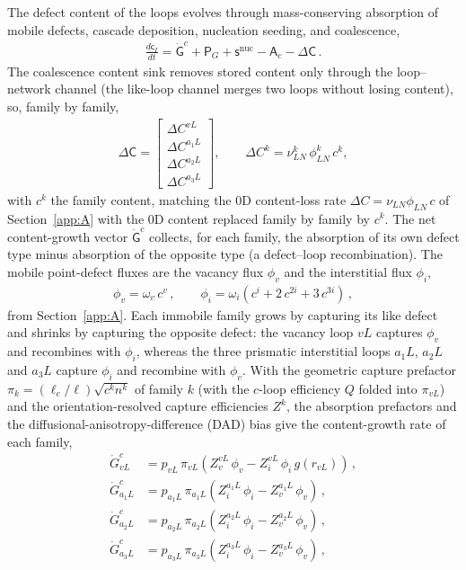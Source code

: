 \documentclass{article}
\newcommand{\spvec}[1]{\bm{\mathsf{#1}}}   %
\begin{document}
The defect content of the loops evolves through mass-conserving absorption of mobile defects, cascade deposition, nucleation seeding, and coalescence,
\begin{align}\label{eq:CIode}
\frac{d\spvec{c}_I}{dt}=
\dot{\spvec{G}}^{c}
+\spvec{P}_G
+\spvec{s}^{\mathrm{nuc}}
-\spvec{A}_c
-\Delta\spvec{C}\, .
\end{align}
The coalescence content sink removes stored content only through the loop--network channel (the like-loop channel merges two loops without losing content), so, family by family,
\begin{align}\label{eq:DeltaC}
\Delta\spvec{C}=\begin{bmatrix}\Delta C^{vL}\\[2pt]\Delta C^{a_1L}\\[2pt]\Delta C^{a_2L}\\[2pt]\Delta C^{a_3L}\end{bmatrix},\qquad
\Delta C^{k}=\nu_{LN}^{k}\,\phi_{LN}^{k}\,c^{k},
\end{align}
with $c^{k}$ the family content, matching the $0$D content-loss rate $\Delta C=\nu_{LN}\phi_{LN}\,c$ of Section~\ref{app:A} with the $0$D content replaced family by family by $c^{k}$.
The net content-growth vector $\dot{\spvec{G}}^{c}$ collects, for each family, the absorption of its own defect type minus absorption of the opposite type (a defect--loop recombination). The mobile point-defect fluxes are the vacancy flux $\phi_v$ and the interstitial flux $\phi_i$,
\begin{align}\label{eq:fluxdef}
\phi_v=\omega_v\,c^v\, ,\qquad
\phi_i=\omega_i\left(c^i+2\,c^{2i}+3\,c^{3i}\right)\, ,
\end{align}
from Section~\ref{app:A}. Each immobile family grows by capturing its like defect and shrinks by capturing the opposite defect: the vacancy loop $vL$ captures $\phi_v$ and recombines with $\phi_i$, whereas the three prismatic interstitial loops $a_1L$, $a_2L$ and $a_3L$ capture $\phi_i$ and recombine with $\phi_v$. With the geometric capture prefactor $\pi_k=(\ell_c/\ell)\sqrt{c^k n^k}$ of family $k$ (with the $c$-loop efficiency $Q$ folded into $\pi_{vL}$) and the orientation-resolved capture efficiencies $Z^k$, the absorption prefactors and the diffusional-anisotropy-difference (DAD) bias give the content-growth rate of each family,
\begin{align}\label{eq:loopcoupling}
\dot G^{c}_{vL}   &=p_{vL}\,\pi_{vL}\left(Z^{vL}_{v}\,\phi_v-Z^{vL}_{i}\,\phi_i\,g(r_{vL})\right)\, ,\\
\dot G^{c}_{a_1L} &=p_{a_1L}\,\pi_{a_1L}\left(Z^{a_1L}_{i}\,\phi_i-Z^{a_1L}_{v}\,\phi_v\right)\, ,\\
\dot G^{c}_{a_2L} &=p_{a_2L}\,\pi_{a_2L}\left(Z^{a_2L}_{i}\,\phi_i-Z^{a_2L}_{v}\,\phi_v\right)\, ,\\
\dot G^{c}_{a_3L} &=p_{a_3L}\,\pi_{a_3L}\left(Z^{a_3L}_{i}\,\phi_i-Z^{a_3L}_{v}\,\phi_v\right)\, ,
\end{align}
\end{document}

